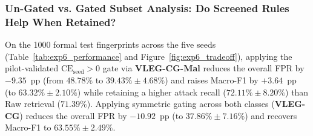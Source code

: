 \documentclass[10pt,a4paper,onecolumn]{article}
\theoremstyle{definition}
\theoremstyle{remark}
\begin{document}
\subsubsection{Un-Gated vs. Gated Subset Analysis: Do Screened Rules Help When Retained?}
On the 1000 formal test fingerprints across the five seeds (Table~\ref{tab:exp6_performance} and Figure~\ref{fig:exp6_tradeoff}), applying the pilot-validated $\mathrm{CE}_{\mathrm{seed}} > 0$ gate via \textbf{VLEG-CG-Mal} reduces the overall FPR by $-9.35$~pp (from $48.78\%$ to $39.43\% \pm 4.68\%$) and raises Macro-F1 by $+3.64$~pp (to $63.32\% \pm 2.10\%$) while retaining a higher attack recall ($72.11\% \pm 8.20\%$) than Raw retrieval ($71.39\%$). Applying symmetric gating across both classes (\textbf{VLEG-CG}) reduces the overall FPR by $-10.92$~pp (to $37.86\% \pm 7.16\%$) and recovers Macro-F1 to $63.55\% \pm 2.49\%$.
\end{document}
